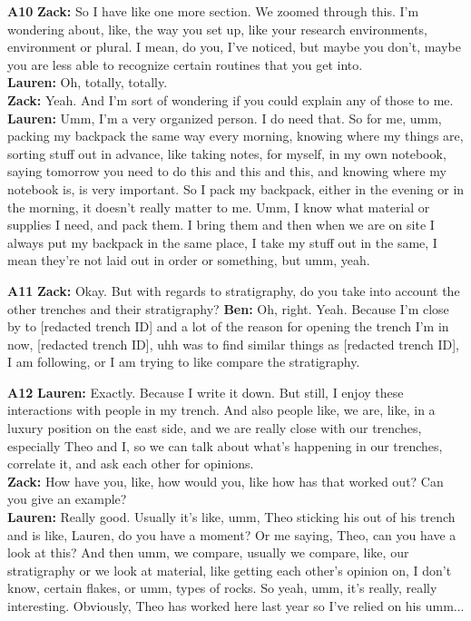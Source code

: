\documentclass{article}
\begin{document}
\noindent\textbf{A10}\label{sec-A10}\newline
\textbf{Zack:} So I have like one more section. We zoomed through this.
I'm wondering about, like, the way you set up, like your research
environments, environment or plural. I mean, do you, I've noticed, but
maybe you don't, maybe you are less able to recognize certain routines
that you get into.\\
\textbf{Lauren:} Oh, totally, totally.\\
\textbf{Zack:} Yeah. And I'm sort of wondering if you could explain any
of those to me.\\
\textbf{Lauren:} Umm, I'm a very organized person. I do need that. So
for me, umm, packing my backpack the same way every morning, knowing
where my things are, sorting stuff out in advance, like taking notes,
for myself, in my own notebook, saying tomorrow you need to do this and
this and this, and knowing where my notebook is, is very important. So I
pack my backpack, either in the evening or in the morning, it doesn't
really matter to me. Umm, I know what material or supplies I need, and
pack them. I bring them and then when we are on site I always put my
backpack in the same place, I take my stuff out in the same, I mean
they're not laid out in order or something, but umm, yeah.\newline

\noindent\textbf{A11}\label{sec-A11}\newline
\textbf{Zack:} Okay. But with regards to stratigraphy, do you take into
account the other trenches and their stratigraphy? \textbf{Ben:} Oh,
right. Yeah. Because I'm close by to {[}redacted trench ID{]} and a lot
of the reason for opening the trench I'm in now, {[}redacted trench
ID{]}, uhh was to find similar things as {[}redacted trench ID{]}, I am
following, or I am trying to like compare the stratigraphy.\newline

\noindent\textbf{A12}\label{sec-A12}\newline
\textbf{Lauren:} Exactly. Because I write it down. But still, I enjoy
these interactions with people in my trench. And also people like, we
are, like, in a luxury position on the east side, and we are really
close with our trenches, especially Theo and I, so we can talk about
what's happening in our trenches, correlate it, and ask each other for
opinions.\\
\textbf{Zack:} How have you, like, how would you, like how has that
worked out? Can you give an example?\\
\textbf{Lauren:} Really good. Usually it's like, umm, Theo sticking his
out of his trench and is like, Lauren, do you have a moment? Or me
saying, Theo, can you have a look at this? And then umm, we compare,
usually we compare, like, our stratigraphy or we look at material, like
getting each other's opinion on, I don't know, certain flakes, or umm,
types of rocks. So yeah, umm, it's really, really interesting.
Obviously, Theo has worked here last year so I've relied on his umm...\newline
\end{document}
